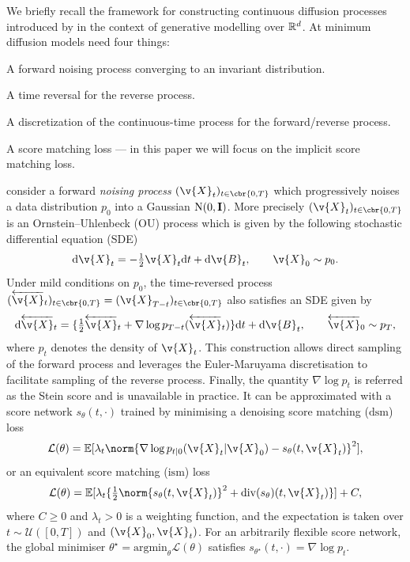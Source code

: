 We briefly recall the framework for constructing continuous diffusion processes introduced by \textcite{song2020score} in the context of generative modelling over $\mathbb{R}^d$.
At minimum diffusion models need four things: \begin{enumerate*}[label=(\roman*)] \item A forward noising process converging to an invariant distribution.
	\item A time reversal for the reverse process.
	\item A discretization of the continuous-time process for the forward/reverse process.
	\item A score matching loss --- in this paper we will focus on the implicit score matching loss.
\end{enumerate*}
\textcite{song2020score} consider a forward \textit{noising process}
$(\v{X}_{t})_{t \in \cbr{0,T}}$ which progressively noises a data distribution
$p_0$ into a Gaussian $\mathrm{N}(0,\m{I})$.
More precisely $(\v{X}_{t})_{t \in \cbr{0,T}}$ is an Ornstein–Uhlenbeck (OU) process which is given by the following stochastic differential equation (SDE) \begin{equation} \label{eq:ornstein_uhlenbeck} \mathrm{d} \v{X}_t = - \tfrac{1}{2}\v{X}_t \mathrm{d} t + \mathrm{d} \v{B}_t, \qquad \v{X}_0 \sim p_0.
\end{equation}
Under mild conditions on $p_0$, the time-reversed process $(\overleftarrow{\v{X}}_t)_{t \in \cbr{0,T}} = (\v{X}_{T-t})_{t \in \cbr{0,T}}$ also satisﬁes an SDE \parencite{cattiaux2021time,haussmann1986time} given by \begin{equation} \label{eq:time_reversal_dupref} \mathrm{d} \overleftarrow{\v{X}}_t = \{\tfrac{1}{2}\overleftarrow{\v{X}}_t + \nabla \log p_{T-t}(\overleftarrow{\v{X}}_t)\} \mathrm{d} t + \mathrm{d} \v{B}_t, \qquad \overleftarrow{\v{X}}_0 \sim p_T, \end{equation} where $p_t$ denotes the density of $\v{X}_t$.
This construction allows direct sampling of the forward process and leverages the Euler-Maruyama discretisation to facilitate sampling of the reverse process.
Finally, the quantity $\nabla \log p_t $ is referred as the Stein score and is unavailable in practice.
It can be approximated with a score network $s_\theta(t,\cdot)$ trained by minimising a denoising score matching ($\mathrm{dsm}$) loss \begin{equation} \label{eq:denoising_sm} \textstyle \mathcal{L}(\theta) = \E [ \lambda_t \norm{ \nabla \log p_{t|0}(\v{X}_t|\v{X}_0) - s_\theta(t, \v{X}_t) }^2], \end{equation} or an equivalent score matching ($\mathrm{ism}$) loss \begin{equation} \label{eq:implicit_sm} \textstyle{ \mathcal{L}(\theta) = \E[ \lambda_t \{ \tfrac{1}{2} \norm{ s_\theta(t, \v{X}_t) }^2 + \mathrm{div}(s_\theta)(t, \v{X}_t)}\}] + C, \end{equation} where $C \geq 0$ and $\lambda_t >0$ is a weighting function, and the expectation is taken over $t \sim \mathcal{U}([0, T])$ and $(\v{X}_0, \v{X}_t)$.
For an arbitrarily flexible score network, the global minimiser $\theta^\star = \mathrm{argmin}_{\theta}\mathcal{L}(\theta)$ satisfies $s_{\theta^\star}(t, \cdot)=\nabla \log p_t$.

